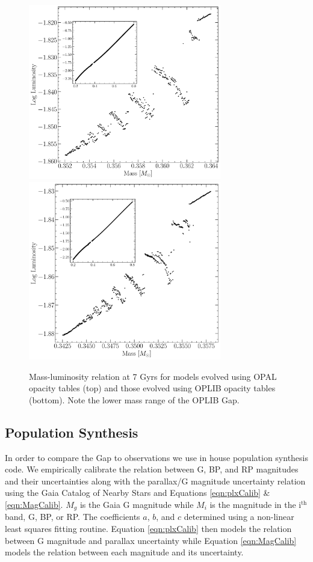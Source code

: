\begin{figure}
	\centering
	\includegraphics[width=0.75\textwidth]{figures/jaoOpacity/OPALPunchIn.pdf}
	\includegraphics[width=0.75\textwidth]{figures/jaoOpacity/OPLIBPunchIn.pdf}
	\caption{Mass-luminosity relation at 7 Gyrs for models evolved using OPAL opacity
	tables (top) and those evolved using OPLIB opacity tables (bottom). Note
	the lower mass range of the OPLIB Gap.}
	\label{fig:PunchIn}
		
\end{figure}

\subsection{Population Synthesis}
In order to compare the Gap to observations we use in house population
synthesis code. We empirically calibrate the relation between G, BP, and RP
magnitudes and their uncertainties along with the parallax/G magnitude
uncertainty relation using the Gaia Catalog of Nearby Stars
\citep[GCNS,][]{GaiaCollaboration2021} and Equations \ref{eqn:plxCalib} \&
\ref{eqn:MagCalib}. $M_{g}$ is the Gaia G magnitude while $M_{i}$ is the
magnitude in the i$^\text{th}$ band, G, BP, or RP. The coefficients $a$, $b$,
and $c$ determined using a non-linear least squares fitting routine. Equation
\ref{eqn:plxCalib} then models the relation between G magnitude and parallax
uncertainty while Equation \ref{eqn:MagCalib} models the relation between each
magnitude and its uncertainty.

